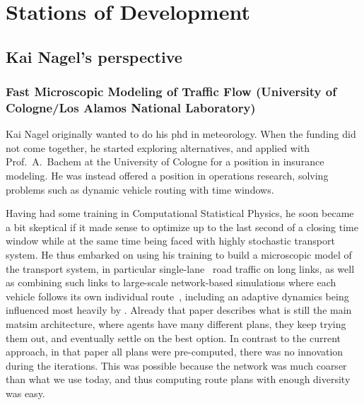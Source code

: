 \section{Stations of Development}
\subsection{Kai Nagel's perspective}

\subsubsection{Fast Microscopic Modeling of Traffic Flow (University of Cologne/Los Alamos National Laboratory)}
\label{sec:history-u-of-cologne-phase}

Kai Nagel originally wanted to do his \acrshort{phd} 
in meteorology.  When the funding did not come together, he started exploring alternatives, and applied with Prof.\ A.\ Bachem at the University of Cologne for a position in insurance modeling.  He was instead offered a position in operations research, solving problems such as dynamic vehicle routing with time windows. 

Having had some training in Computational Statistical Physics, he soon became a bit skeptical if it made sense to optimize up to the last second of a closing time window while at the same time being faced with highly stochastic transport system.  He thus embarked on using his training to build a microscopic model of the transport system, in particular single-lane~\citep{NagelSchreckenberg1992CA,Nagel1999flowTheoTrr} road traffic on long links, as well as combining such links to large-scale network-based simulations where each vehicle follows its own individual route~\citep{Nagel1996NRW}, including an adaptive dynamics being influenced most heavily by \cite{ArthurBar}.  Already that paper \citep{Nagel1996NRW} describes what is still the main \gls{matsim} architecture, where agents have many different plans, they keep trying them out, and eventually settle on the best option.  In contrast to the current approach, in that paper all plans were pre-computed, \ie there was no innovation during the iterations.  This was possible because the network was much coarser than what we use today, and thus computing route plans with enough diversity was easy.

